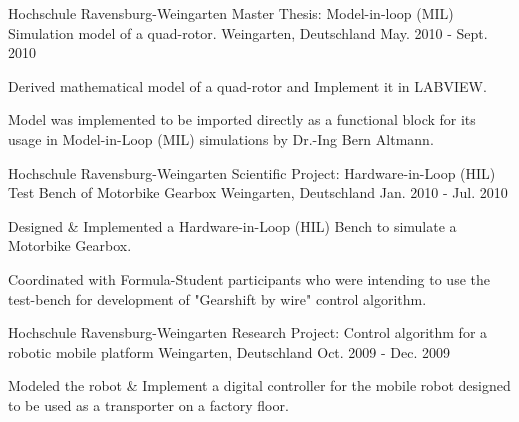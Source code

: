 

\begin{cventries}

  \cventry
    {Hochschule Ravensburg-Weingarten} %
    {Master Thesis: Model-in-loop (MIL) Simulation model of a quad-rotor.} %
    {Weingarten, Deutschland} %
    {May. 2010 - Sept. 2010} %
    {
      \begin{cvitems} %
        \item {Derived mathematical model of a quad-rotor and Implement it in LABVIEW.}
        \item {Model was implemented to be imported directly as a functional block for its usage in Model-in-Loop (MIL) simulations by Dr.-Ing Bern Altmann.}
      \end{cvitems}
    }
    
  \cventry
    {Hochschule Ravensburg-Weingarten} %
    {Scientific Project: Hardware-in-Loop (HIL) Test Bench of Motorbike Gearbox} %
    {Weingarten, Deutschland} %
    {Jan. 2010 - Jul. 2010} %
    {
      \begin{cvitems} %
      \item {Designed \& Implemented a Hardware-in-Loop (HIL) Bench to simulate a Motorbike Gearbox.}
      \item {Coordinated with Formula-Student participants who were intending to use the test-bench for development of "Gearshift by wire" control algorithm.}
      \end{cvitems}
    }
   
  \cventry
    {Hochschule Ravensburg-Weingarten} %
    {Research Project: Control algorithm for a robotic mobile platform} %
    {Weingarten, Deutschland} %
    {Oct. 2009 - Dec. 2009} %
    {
      \begin{cvitems} %
      	\item {Modeled the robot \& Implement a digital controller for the mobile robot designed to be used as a transporter on a factory floor.}
      \end{cvitems}
    }
    

\end{cventries}
